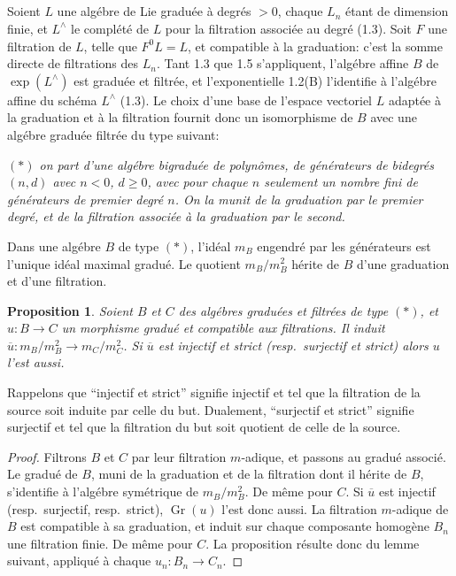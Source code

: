 \documentclass[11pt,a4paper]{article}
\theoremstyle{plain}
\newtheorem{proposition}[theorem]{Proposition}
\theoremstyle{definition}
\newcommand{\Gr}{\operatorname{Gr}}
\begin{document}
\subsection{}
Soient $L$ une alg\'ebre de Lie gradu\'ee \`a degr\'es $> 0$, chaque $L_n$ \'etant de dimension finie, et $L^{\wedge}$ le compl\'et\'e de $L$ pour la filtration associ\'ee au degr\'e (1.3). Soit $F$ une filtration de $L$, telle que $F^0L = L$, et compatible \`a la graduation: c'est la somme directe de filtrations des $L_n$. Tant 1.3 que 1.5 s'appliquent, l'alg\'ebre affine $B$ de $\exp(L^{\wedge})$ est gradu\'ee et filtr\'ee, et l'exponentielle 1.2(B) l'identifie \`a l'alg\'ebre affine du sch\'ema $L^{\wedge}$ (1.3). Le choix d'une base de l'espace vectoriel $L$ adapt\'ee \`a la graduation et \`a la filtration fournit donc un isomorphisme de $B$ avec une alg\'ebre gradu\'ee filtr\'ee du type suivant:

\emph{$(\ast)$ on part d'une alg\'ebre bigradu\'ee de polyn\^omes, de g\'en\'erateurs de bidegr\'es $(n,d)$ avec $n < 0$, $d \geq 0$, avec pour chaque $n$ seulement un nombre fini de g\'en\'erateurs de premier degr\'e $n$. On la munit de la graduation par le premier degr\'e, et de la filtration associ\'ee \`a la graduation par le second.}

Dans une alg\'ebre $B$ de type $(\ast)$, l'id\'eal $m_B$ engendr\'e par les g\'en\'erateurs est l'unique id\'eal maximal gradu\'e. Le quotient $m_B/m_B^2$ h\'erite de $B$ d'une graduation et d'une filtration.

\begin{proposition}
\label{prop:1.12}
Soient $B$ et $C$ des alg\'ebres gradu\'ees et filtr\'ees de type $(\ast)$, et $u: B \to C$ un morphisme gradu\'e et compatible aux filtrations. Il induit $\overline{u}: m_B/m_B^2 \to m_C/m_C^2$. Si $\overline{u}$ est injectif et strict (resp.~surjectif et strict) alors $u$ l'est aussi.
\end{proposition}

Rappelons que ``injectif et strict'' signifie injectif et tel que la filtration de la source soit induite par celle du but. Dualement, ``surjectif et strict'' signifie surjectif et tel que la filtration du but soit quotient de celle de la source.

\begin{proof}
Filtrons $B$ et $C$ par leur filtration $m$-adique, et passons au gradu\'e associ\'e. Le gradu\'e de $B$, muni de la graduation et de la filtration dont il h\'erite de $B$, s'identifie \`a l'alg\'ebre sym\'etrique de $m_B/m_B^2$. De m\^eme pour $C$. Si $\overline{u}$ est injectif (resp.~surjectif, resp.~strict), $\Gr(u)$ l'est donc aussi. La filtration $m$-adique de $B$ est compatible \`a sa graduation, et induit sur chaque composante homog\`ene $B_n$ une filtration finie. De m\^eme pour $C$. La proposition r\'esulte donc du lemme suivant, appliqu\'e \`a chaque $u_n: B_n \to C_n$.
\end{proof}
\end{document}
